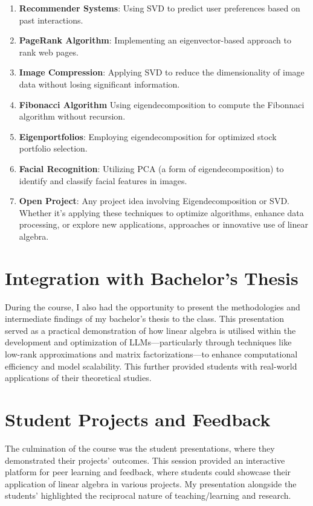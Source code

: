 \begin{enumerate}
  \item \textbf{Recommender Systems}: Using SVD to predict user preferences based on past interactions.
  \item \textbf{PageRank Algorithm}: Implementing an eigenvector-based approach to rank web pages.
  \item \textbf{Image Compression}: Applying SVD to reduce the dimensionality of image data without losing significant information.
  \item \textbf{Fibonacci Algorithm} Using eigendecomposition to compute the Fibonnaci algorithm without recursion.
  \item \textbf{Eigenportfolios}: Employing eigendecomposition for optimized stock portfolio selection.
  \item \textbf{Facial Recognition}: Utilizing PCA (a form of eigendecomposition) to identify and classify facial features in images.
  \item \textbf{Open Project}: Any project idea involving Eigendecomposition or SVD. Whether it's applying these techniques to optimize algorithms, enhance data processing, or explore new applications, approaches or innovative use of linear algebra.
\end{enumerate}

\section*{Integration with Bachelor's Thesis}

During the course, I also had the opportunity to present the methodologies and intermediate findings of my bachelor's thesis to the class. This presentation served as a practical demonstration of how linear algebra is utilised within the development and optimization of LLMs—particularly through techniques like low-rank approximations and matrix factorizations—to enhance computational efficiency and model scalability. This further provided students with real-world applications of their theoretical studies.

\section*{Student Projects and Feedback}

The culmination of the course was the student presentations, where they demonstrated their projects' outcomes. This session provided an interactive platform for peer learning and feedback, where students could showcase their application of linear algebra in various projects. My presentation alongside the students' highlighted the reciprocal nature of teaching/learning and research.

